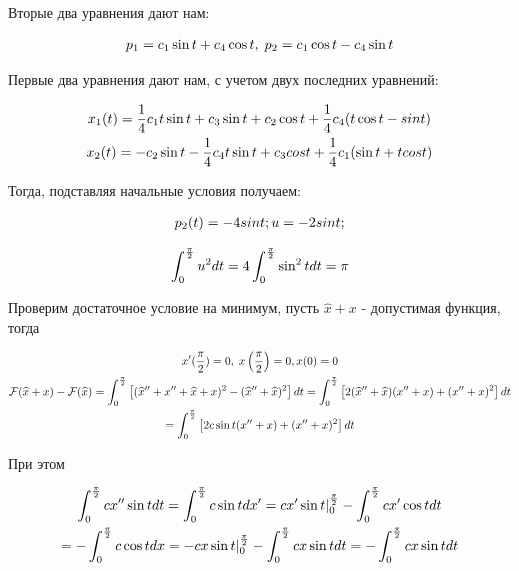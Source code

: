 \documentclass[titlepage]{article}
\def\l{\left}
\def\r{\right}
\begin{document}
Вторые два уравнения дают нам:

\begin{gather*}
	\notag p_1 = c_1\sin{t} + c_4\cos{t}, \; p_2 = c_1\cos{t} - c_4\sin{t} \\
\end{gather*}

Первые два уравнения дают нам, с учетом двух последних уравнений:

\begin{gather*}
	\notag x_1(t) = \frac{1}{4}c_1t\sin{t} + c_3\sin{t} + c_2\cos{t} + \frac{1}{4}c_4(t\cos{t} - sin{t}) \\
	\notag x_2(t) = -c_2\sin{t} - \frac{1}{4}c_4t\sin{t} + c_3cos{t} + \frac{1}{4}c_1(\sin{t} + tcos{t})\\
\end{gather*}

Тогда, подставляя начальные условия получаем:

\begin{gather*}
	\notag p_2(t) = -4sin{t};
	\notag u = -2sin{t};
\end{gather*}

\begin{gather*}
	\notag \int_{0}^{\frac{\pi}{2}}u^2dt = 4\int_{0}^{\frac{\pi}{2}}\sin^2{t}dt = \pi \\	
\end{gather*}

Проверим достаточное условие на минимум, пусть $\widehat{x} + x$ - допустимая функция, тогда

\begin{gather*}
	\notag x'(\frac{\pi}{2}) = 0, \; x\l(\frac{\pi}{2}\r) = 0, x(0) = 0\\
	\notag \mathcal{F}(\widehat{x} + x) - \mathcal{F}(\widehat{x}) = \int_{0}^{\frac{\pi}{2}}\l[ (\widehat{x}'' + x'' + \widehat{x} + x)^2 - (\widehat{x}'' + \widehat{x})^2 \r]dt = \int_{0}^{\frac{\pi}{2}}\l[ 2(\widehat{x}'' + \widehat{x})(x'' + x) + (x'' + x)^2 \r]dt\\ = \int_{0}^{\frac{\pi}{2}}\l[ 2c\sin{t}(x'' + x) + (x'' + x)^2 \r]dt \\
\end{gather*}

При этом

\begin{gather*}
	\notag \int_{0}^{\frac{\pi}{2}} cx''\sin{t} dt = \int_{0}^{\frac{\pi}{2}} c\sin{t} dx' = cx'\sin{t}\vert_0^{\frac{\pi}{2}} - \int_{0}^{\frac{\pi}{2}} cx'\cos{t} dt \\
	\notag = -\int_{0}^{\frac{\pi}{2}} c\cos{t} dx = -cx\sin{t}\vert_0^{\frac{\pi}{2}} - \int_{0}^{\frac{\pi}{2}} cx\sin{t} dt = - \int_{0}^{\frac{\pi}{2}} cx\sin{t} dt \\	
\end{gather*}
\end{document}
